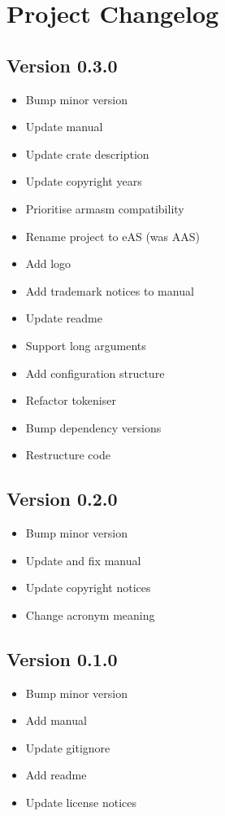 \documentclass[a4paper]{article}
\begin{document}
	\section{Project Changelog}
		\label{sec:project_changelog}
		\begin{multicols*}{2}
			\subsection*{Version 0.3.0}
				\label{sec:project_changelog:version_0-3-0}
				\begin{itemize}
					\item Bump minor version
					\item Update manual
					\item Update crate description
					\item Update copyright years
					\item Prioritise armasm compatibility
					\item Rename project to eAS (was AAS)
					\item Add logo
					\item Add trademark notices to manual
					\item Update readme
					\item Support long arguments
					\item Add configuration structure
					\item Refactor tokeniser
					\item Bump dependency versions
					\item Restructure code
				\end{itemize}

			\subsection*{Version 0.2.0}
				\label{sec:project_changelog:version_0-2-0}
				\begin{itemize}
					\item Bump minor version
					\item Update and fix manual
					\item Update copyright notices
					\item Change acronym meaning
				\end{itemize}

			\subsection*{Version 0.1.0}
				\label{sec:project_changelog:version_0-1-0}
				\begin{itemize}
					\item Bump minor version
					\item Add manual
					\item Update gitignore
					\item Add readme
					\item Update license notices
				\end{itemize}


\end{multicols*}
\end{document}
